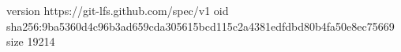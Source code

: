 version https://git-lfs.github.com/spec/v1
oid sha256:9ba5360d4c96b3ad659cda305615bcd115c2a4381edfdbd80b4fa50e8ec75669
size 19214

